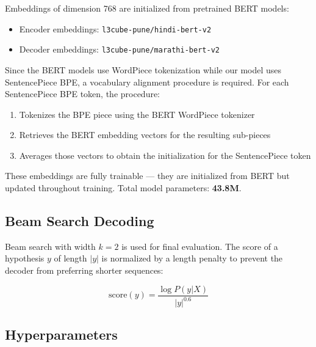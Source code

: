 \documentclass[12pt,a4paper]{article}
\begin{document}
Embeddings of dimension 768 are initialized from pretrained BERT models:
\begin{itemize}
    \item Encoder embeddings: \texttt{l3cube-pune/hindi-bert-v2}
    \item Decoder embeddings: \texttt{l3cube-pune/marathi-bert-v2}
\end{itemize}

Since the BERT models use WordPiece tokenization while our model uses SentencePiece BPE, a vocabulary alignment procedure is required. For each SentencePiece BPE token, the procedure:
\begin{enumerate}
    \item Tokenizes the BPE piece using the BERT WordPiece tokenizer
    \item Retrieves the BERT embedding vectors for the resulting sub-pieces
    \item Averages those vectors to obtain the initialization for the SentencePiece token
\end{enumerate}

These embeddings are fully trainable — they are initialized from BERT but updated throughout training. Total model parameters: \textbf{43.8M}.

\subsection{Beam Search Decoding}

Beam search with width $k=2$ is used for final evaluation. The score of a hypothesis $y$ of length $|y|$ is normalized by a length penalty to prevent the decoder from preferring shorter sequences:

\[
\text{score}(y) = \frac{\log P(y|X)}{|y|^{0.6}}
\]

\subsection{Hyperparameters}
\end{document}
